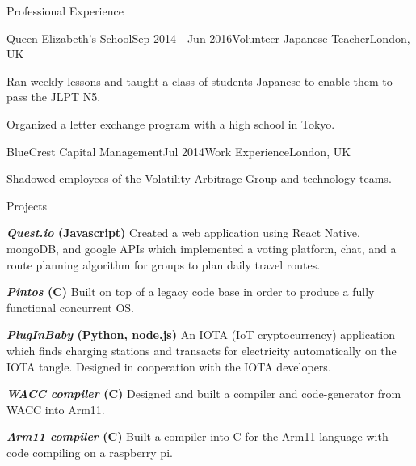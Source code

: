\documentclass[10pt]{resume} %
\begin{document}
\begin{rSection}{Professional Experience}

\begin{rSubsection}{Queen Elizabeth's School}{Sep 2014 - Jun 2016}{Volunteer Japanese Teacher}{London, UK}
    \item Ran weekly lessons and taught a class of students Japanese to enable
    them to pass the JLPT N5.
    \item Organized a letter exchange program with a high school in Tokyo.
\end{rSubsection}


\begin{rSubsection}{BlueCrest Capital Management}{Jul 2014}{Work Experience}{London, UK}
    \item Shadowed employees of the Volatility Arbitrage Group and technology
    teams.
\end{rSubsection}

\end{rSection}


\begin{rSection}{Projects}
    \item \textbf{\textit{Quest.io} (Javascript)} Created a web application
    using React Native, mongoDB, and google APIs which implemented a voting
    platform, chat, and a route planning algorithm for groups to plan daily
    travel routes.
    \item \textbf{\textit{Pintos} (C)} Built on top of a legacy code base in
    order to produce a fully functional concurrent OS.
    \item \textbf{\textit{PlugInBaby} (Python, node.js)} An IOTA (IoT
    cryptocurrency) application which finds charging stations and transacts for
    electricity automatically on the IOTA tangle. Designed in cooperation with
    the IOTA developers.
    \item \textbf{\textit{WACC compiler} (C)} Designed and built a compiler and
    code-generator from WACC into Arm11.
    \item \textbf{\textit{Arm11 compiler} (C)} Built a compiler into C for the
    Arm11 language with code compiling on a raspberry pi.
\end{rSection}
\end{document}

